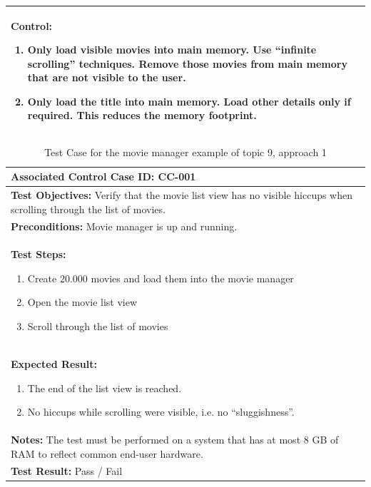 \begin{table}[h!]
\begin{tabular}{|p{}|}
		\hline
		\textbf{Control}: 
		\begin{enumerate}
			\item Only load visible movies into main memory. Use \enquote{infinite scrolling} techniques. Remove those movies from main memory that are not visible to the user.
			\item Only load the title into main memory. Load other details only if required. This reduces the memory footprint.
		\end{enumerate} \\
		\hline
	\end{tabular}
\end{table}


%
%
%
\begin{table}[h!]
	\centering
	\caption{Test Case for the movie manager example of topic 9, approach 1}
	\label{tbl:topic_9_test_case}
	\begin{tabular}{|p{}|}\hline
		\textbf{Associated Control Case ID:} CC-001\\
		\hline
		\textbf{Test Objectives:} \newline Verify that the movie list view has no visible hiccups when scrolling through the list of movies. \\
		\hline
		\textbf{Preconditions:} Movie manager is up and running.\\
		\hline
		\textbf{Test Steps:} \begin{enumerate}
			\item Create 20.000 movies and load them into the movie manager
			\item Open the movie list view
			\item Scroll through the list of movies
		\end{enumerate} \\
		\hline
		\textbf{Expected Result:} \begin{enumerate}
			\item The end of the list view is reached.
			\item No hiccups while scrolling were visible, i.e. no \enquote{sluggishness}.
		\end{enumerate} \\
		\hline
		\textbf{Notes:} \newline
		The test must be performed on a system that has at most 8 GB of RAM to reflect common end-user hardware. \\
		\hline
		\textbf{Test Result:} Pass / Fail \\
		\hline
										
	\end{tabular}
\end{table}

